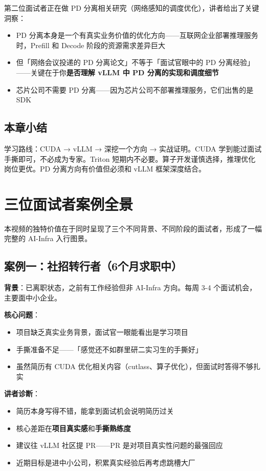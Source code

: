 \documentclass[a4paper]{article}
\begin{document}
第二位面试者正在做 PD 分离相关研究（网络感知的调度优化），讲者给出了关键洞察：

\begin{itemize}
  \item PD 分离本身是一个有真实业务价值的优化方向——互联网企业部署推理服务时，Prefill 和 Decode 阶段的资源需求差异巨大
  \item 但「网络会议投递的 PD 分离论文」不等于「面试官眼中的 PD 分离经验」——关键在于你\textbf{是否理解 vLLM 中 PD 分离的实现和调度细节}
  \item 芯片公司不需要 PD 分离——因为芯片公司不部署推理服务，它们出售的是 SDK
\end{itemize}

\subsection{本章小结}

学习路线：CUDA → vLLM → 深挖一个方向 → 实战证明。CUDA 学到能过面试手撕即可，不必成为专家。Triton 短期内不必要。算子开发谨慎选择，推理优化岗位更优。PD 分离方向有价值但必须和 vLLM 框架深度结合。

\section{三位面试者案例全景}

本视频的独特价值在于同时呈现了三个不同背景、不同阶段的面试者，形成了一幅完整的 AI-Infra 入行图景。

\subsection{案例一：社招转行者（6个月求职中）}

\textbf{背景}：已离职状态，之前有工作经验但非 AI-Infra 方向。每周 3-4 个面试机会，主要面中小企业。

\textbf{核心问题}：
\begin{itemize}
  \item 项目缺乏真实业务背景，面试官一眼能看出是学习项目
  \item 手撕准备不足——「感觉还不如群里研二实习生的手撕好」
  \item 虽然简历有 CUDA 优化相关内容（cutlass、算子优化），但面试时答得不够扎实
\end{itemize}

\textbf{讲者诊断}：
\begin{itemize}
  \item 简历本身写得不错，能拿到面试机会说明简历过关
  \item 核心差距在\textbf{项目真实感}和\textbf{手撕熟练度}
  \item 建议往 vLLM 社区提 PR——PR 是对项目真实性问题的最强回应
  \item 近期目标是进中小公司，积累真实经验后再考虑跳槽大厂
\end{itemize}
\end{document}
